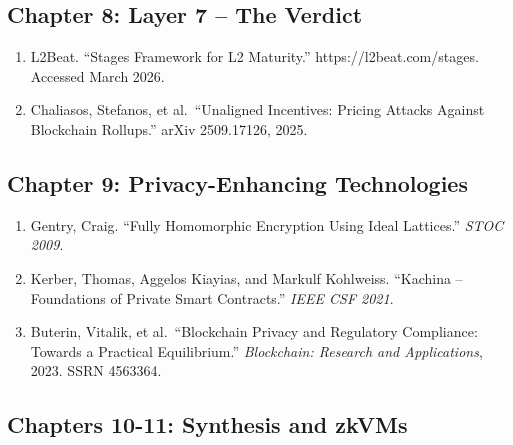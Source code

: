 \documentclass[
  11pt,
  openany]{report}
\providecommand{\tightlist}{%
  \setlength{\itemsep}{0pt}\setlength{\parskip}{0pt}}
\begin{document}
\subsection{Chapter 8: Layer 7 -- The
Verdict}\label{chapter-8-layer-7-the-verdict-1}

\begin{enumerate}
\def\labelenumi{\arabic{enumi}.}
\setcounter{enumi}{26}
\tightlist
\item
  L2Beat. ``Stages Framework for L2 Maturity.'' https://l2beat.com/stages.
  Accessed March 2026.
\item
  Chaliasos, Stefanos, et al.~``Unaligned Incentives: Pricing Attacks Against
  Blockchain Rollups.'' arXiv 2509.17126, 2025.
\end{enumerate}

\subsection{Chapter 9: Privacy-Enhancing
Technologies}\label{chapter-9-privacy-enhancing-technologies-1}

\begin{enumerate}
\def\labelenumi{\arabic{enumi}.}
\setcounter{enumi}{28}
\tightlist
\item
  Gentry, Craig. ``Fully Homomorphic Encryption Using Ideal Lattices.''
  \emph{STOC 2009}.
\item
  Kerber, Thomas, Aggelos Kiayias, and Markulf Kohlweiss. ``Kachina --
  Foundations of Private Smart Contracts.'' \emph{IEEE CSF 2021}.
\item
  Buterin, Vitalik, et al.~``Blockchain Privacy and Regulatory Compliance:
  Towards a Practical Equilibrium.'' \emph{Blockchain: Research and
  Applications}, 2023. SSRN 4563364.
\end{enumerate}

\subsection{Chapters 10-11: Synthesis and
zkVMs}\label{chapters-10-11-synthesis-and-zkvms}
\end{document}
